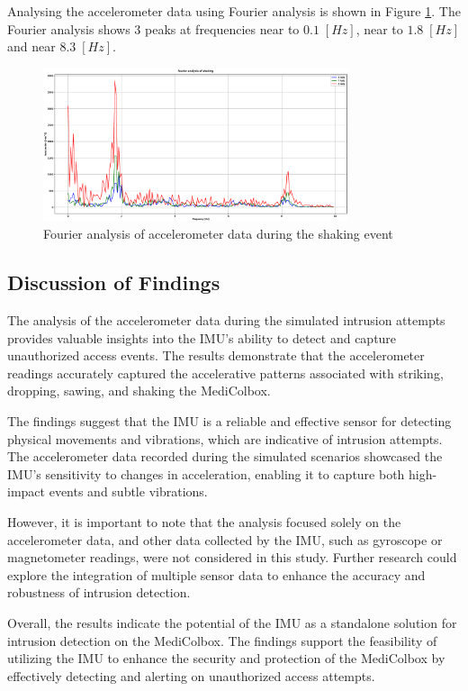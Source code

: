 \documentclass[../main.tex]{subfiles}
\begin{document}
Analysing the accelerometer data using Fourier analysis is shown in
Figure \ref{fig:fourier_accelerometer_shaking}.
The Fourier analysis shows $3$ peaks at frequencies
near to $0.1\;[Hz]$, near to $1.8\;[Hz]$ and near $8.3\;[Hz]$.


\begin{figure}[htbp]
    \centering
    \includegraphics[width=0.8\textwidth]{resources/figures/Fourier_acceleration_shaking.eps}
    \caption{Fourier analysis of accelerometer data during the shaking event}
    \label{fig:fourier_accelerometer_shaking}
\end{figure}

\subsection{Discussion of Findings}

The analysis of the accelerometer data during the
simulated intrusion attempts provides valuable insights into the
IMU's ability to detect and capture unauthorized access events.
The results demonstrate that the
accelerometer readings accurately captured the
accelerative patterns associated with striking,
dropping, sawing, and shaking the MediColbox.

The findings suggest that the IMU is a reliable and
effective sensor for detecting physical movements and vibrations,
which are indicative of intrusion attempts.
The accelerometer data recorded during the
simulated scenarios showcased the IMU's sensitivity to
changes in acceleration,
enabling it to capture both high-impact events and
subtle vibrations.

However, it is important to note that the analysis
focused solely on the accelerometer data,
and other data collected by the IMU,
such as gyroscope or magnetometer readings,
were not considered in this study.
Further research could explore the
integration of multiple sensor data to enhance the
accuracy and robustness of intrusion detection.

Overall, the results indicate the potential of the IMU as
a standalone solution for intrusion detection on the
MediColbox. The findings support the feasibility of
utilizing the IMU to enhance the security and protection of the
MediColbox by effectively detecting and alerting on
unauthorized access attempts.
\end{document}
